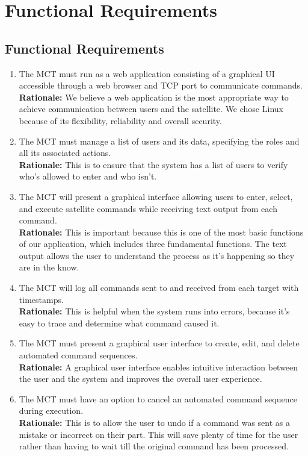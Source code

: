 \documentclass[12pt]{article}
\begin{document}
\section{Functional Requirements}
\subsection{Functional Requirements}
\begin{enumerate}
    \item The MCT must run as a web application consisting of a graphical UI accessible through a web browser and TCP port to communicate commands. \\
    \textbf{Rationale:} We believe a web application is the most appropriate way to achieve communication between users and the satellite. We chose Linux because of its flexibility, reliability and overall security. 
    \item The MCT must manage a list of users and its data, specifying the roles and all its associated actions. \\
    \textbf{Rationale:} This is to ensure that the system has a list of users to verify who’s allowed to enter and who isn’t. 
    \item The MCT will present a graphical interface allowing users to enter, select, and execute satellite commands while receiving text output from each command. \\
    \textbf{Rationale:} This is important because this is one of the most basic functions of our application, which includes three fundamental functions. The text output allows the user to understand the process as it’s happening so they are in the know. 
    \item  The MCT will log all commands sent to and received from each target with timestamps. \\
    \textbf{Rationale:} This is helpful when the system runs into errors, because it’s easy to trace and determine what command caused it. 
    \item The MCT must present a graphical user interface to create, edit, and delete automated command sequences. \\
    \textbf{Rationale:} A graphical user interface enables intuitive interaction between the user and the system and improves the overall user experience. 
    \item The MCT must have an option to cancel an automated command sequence during execution. \\
    \textbf{Rationale:} This is to allow the user to undo if a command was sent as a mistake or incorrect on their part. This will save plenty of time for the user rather than having to wait till the original command has been processed. 

\end{enumerate}
\end{document}
